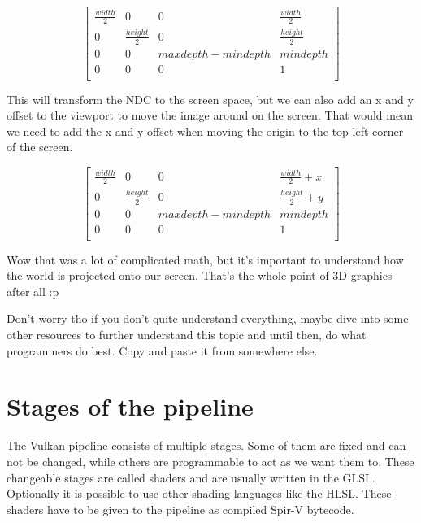 \documentclass[12pt]{report} \usepackage{preamble}
\begin{document}
\[
	\begin{bmatrix}
		\frac{width}{2} & 0                & 0                   & \frac{width}{2}  \\
		0               & \frac{height}{2} & 0                   & \frac{height}{2} \\
		0               & 0                & maxdepth - mindepth & mindepth         \\
		0               & 0                & 0                   & 1                \\
	\end{bmatrix}
\]

This will transform the \ac{NDC} to the screen space, but we can also add an x
and y offset to the viewport to move the image around on the screen.
That would mean we need to add the x and y offset when moving
the origin to the top left corner of the screen.

\[
	\begin{bmatrix}
		\frac{width}{2} & 0                & 0                   & \frac{width}{2} + x  \\
		0               & \frac{height}{2} & 0                   & \frac{height}{2} + y \\
		0               & 0                & maxdepth - mindepth & mindepth             \\
		0               & 0                & 0                   & 1                    \\
	\end{bmatrix}
\]

Wow that was a lot of complicated math, but it's important to understand how the world is
projected onto our screen. That's the whole point of 3D graphics after all :p

Don't worry tho if you don't quite understand everything, maybe dive into some other resources to further
understand this topic and until then, do what programmers do best. Copy and paste it from somewhere else.

\section{Stages of the pipeline}

The Vulkan pipeline consists of multiple stages. Some of them are fixed
and can not be changed, while others are programmable to act as we
want them to. These changeable stages are called shaders and are usually
written in the \ac{GLSL}. Optionally it is possible
to use other shading languages like the \ac{HLSL}.
These shaders have to be given to the pipeline as compiled \ac{Spir-V} bytecode. \cite{spirv}
\end{document}

